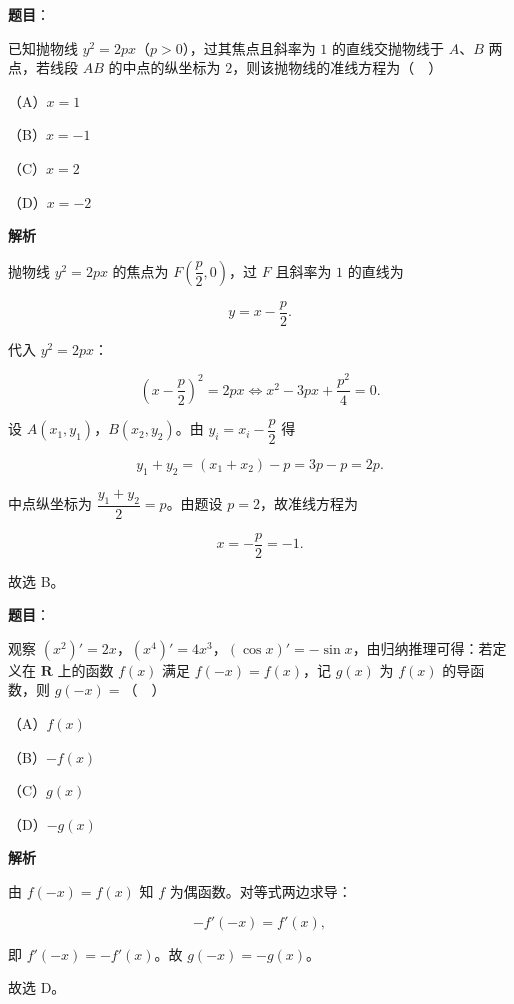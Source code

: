 \begin{answer}

\textbf{题目}：

已知抛物线 $y^2=2px$（$p>0$），过其焦点且斜率为 $1$ 的直线交抛物线于 $A$、$B$ 两点，若线段 $AB$ 的中点的纵坐标为 $2$，则该抛物线的准线方程为（　）

（A）$x=1$

（B）$x=-1$

（C）$x=2$

（D）$x=-2$

\textbf{解析}

抛物线 $y^2=2px$ 的焦点为 $F\left(\dfrac p2,0\right)$，过 $F$ 且斜率为 $1$ 的直线为

\nopagebreak[4]
\[y=x-\frac p2.\]

代入 $y^2=2px$：

\nopagebreak[4]
\[\left(x-\frac p2\right)^2=2px
\iff x^2-3px+\frac{p^2}4=0.\]

设 $A(x_1,y_1)$，$B(x_2,y_2)$。由 $y_i=x_i-\dfrac p2$ 得

\nopagebreak[4]
\[y_1+y_2=(x_1+x_2)-p=3p-p=2p.\]

中点纵坐标为 $\dfrac{y_1+y_2}2=p$。由题设 $p=2$，故准线方程为

\nopagebreak[4]
\[x=-\frac p2=-1.\]

故选 B。


\end{answer}
\begin{answer}

\textbf{题目}：

观察 $(x^2)'=2x$，$(x^4)'=4x^3$，$(\cos x)'=-\sin x$，由归纳推理可得：若定义在 $\mathbf R$ 上的函数 $f(x)$ 满足 $f(-x)=f(x)$，记 $g(x)$ 为 $f(x)$ 的导函数，则 $g(-x)=$（　）

（A）$f(x)$

（B）$-f(x)$

（C）$g(x)$

（D）$-g(x)$

\textbf{解析}

由 $f(-x)=f(x)$ 知 $f$ 为偶函数。对等式两边求导：

\nopagebreak[4]
\[-f'(-x)=f'(x),\]

即 $f'(-x)=-f'(x)$。故 $g(-x)=-g(x)$。

故选 D。


\end{answer}
